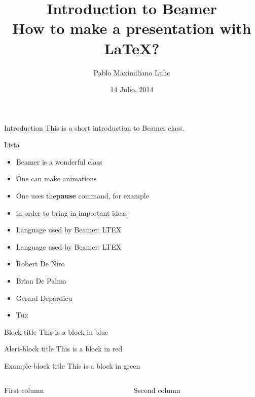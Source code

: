 \documentclass{beamer}
\title[Proxy Adaptativo para Protocolos Web Avanzados]{Introduction  to Beamer\\How to make a presentation with LaTeX?}
\author{Pablo Maximiliano Lulic}
\institute{UNLu}
\date{14 Julio, 2014}
\begin{document}
\begin{frame}
\titlepage
\end{frame}


\begin{frame}{Introduction}
This is a short introduction to Beamer class.
\end{frame}

\begin{frame}{Lista}
\begin{itemize}
\pause \item Beamer is a wonderful class
\pause \item One can make animations
\pause \item One uses the\textbf{pause} command, for example
\pause \item in order to bring in important ideas
\end{itemize}
\end{frame}

\begin{frame}

\begin{itemize}
\item Language used by Beamer: LTEX
\item Language used by Beamer: LTEX
\end{itemize}

\end{frame}

\begin{frame}
\begin{itemize}
\item <+-| alert@+> Robert De Niro
\item <+-| alert@+> Brian De Palma
\item <+-| alert@+> Gerard Depardieu
\item <+-| alert@+> Tux
\end{itemize}
\end{frame}

\begin{frame}
\begin{block}{Block title}
This is a block in blue
\end{block}

\begin{alertblock}{Alert-block title}
This is a block in red
\end{alertblock}

\begin{exampleblock}{Example-block title}
This is a block in green
\end{exampleblock}
\end{frame}

\begin{frame}
\begin{columns}
\begin{column}[l]{5cm}
First column
\end{column}
\begin{column}[r]{5cm}
Second column
\end{column}
\end{columns}
\end{frame}
\end{document}
